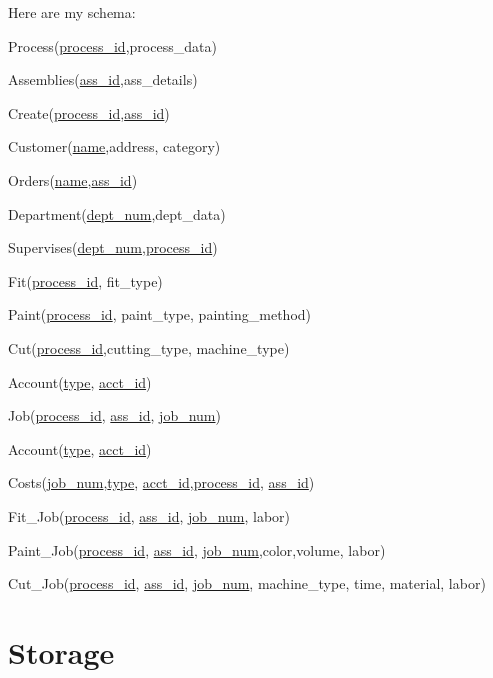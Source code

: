 \documentclass[11pt]{article}
\begin{document}
\indent Here are my schema:

Process(\underline{process\_id},process\_data)

Assemblies(\underline{ass\_id},ass\_details)

Create(\underline{process\_id},\underline{ass\_id})

Customer(\underline{name},address, category)

Orders(\underline{name},\underline{ass\_id})

Department(\underline{dept\_num},dept\_data)

Supervises(\underline{dept\_num},\underline{process\_id})

Fit(\underline{process\_id}, fit\_type)

Paint(\underline{process\_id}, paint\_type, painting\_method)

Cut(\underline{process\_id},cutting\_type, machine\_type)

Account(\underline{type}, \underline{acct\_id})

Job(\underline{process\_id}, \underline{ass\_id}, \underline{job\_num})

Account(\underline{type}, \underline{acct\_id})

Costs(\underline{job\_num},\underline{type}, \underline{acct\_id},\underline{process\_id}, \underline{ass\_id})

Fit\_Job(\underline{process\_id}, \underline{ass\_id}, \underline{job\_num}, labor)

Paint\_Job(\underline{process\_id}, \underline{ass\_id}, \underline{job\_num},color,volume, labor)

Cut\_Job(\underline{process\_id}, \underline{ass\_id}, \underline{job\_num}, machine\_type, time, material, labor)

\newpage
\section{Storage}
\end{document}
